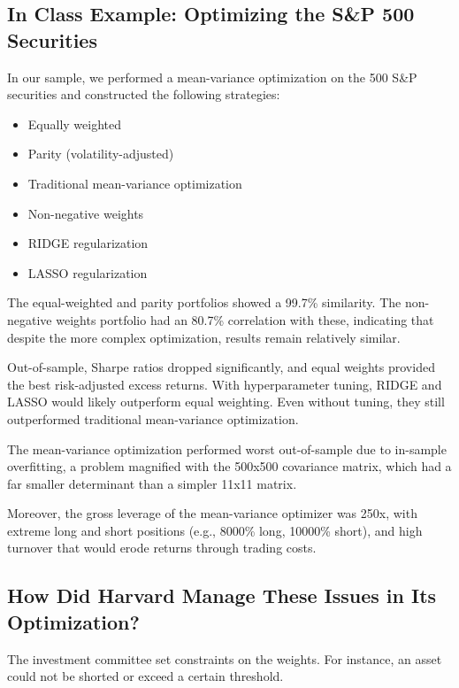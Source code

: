 \documentclass{article}
\begin{document}
\hypertarget{optimizing-the-sp-500-securities}{%
\subsection{In Class Example: Optimizing the S\&P 500
Securities}\label{optimizing-the-sp-500-securities}}

In our sample, we performed a mean-variance optimization on the 500 S\&P
securities and constructed the following strategies: 
\begin{itemize}
    \item Equally weighted
    \item Parity (volatility-adjusted)
    \item Traditional mean-variance optimization
    \item Non-negative weights
    \item RIDGE regularization
    \item LASSO regularization
\end{itemize}

The equal-weighted and parity portfolios showed a 99.7\% similarity. The
non-negative weights portfolio had an 80.7\% correlation with these,
indicating that despite the more complex optimization, results remain
relatively similar.

Out-of-sample, Sharpe ratios dropped significantly, and equal weights
provided the best risk-adjusted excess returns. With hyperparameter
tuning, RIDGE and LASSO would likely outperform equal weighting. Even
without tuning, they still outperformed traditional mean-variance
optimization.

The mean-variance optimization performed worst out-of-sample due to
in-sample overfitting, a problem magnified with the 500x500 covariance
matrix, which had a far smaller determinant than a simpler 11x11 matrix.

Moreover, the gross leverage of the mean-variance optimizer was 250x,
with extreme long and short positions (e.g., 8000\% long, 10000\%
short), and high turnover that would erode returns through trading
costs.

\hypertarget{how-did-harvard-manage-these-issues-in-its-optimization}{%
\subsection{How Did Harvard Manage These Issues in Its
Optimization?}\label{how-did-harvard-manage-these-issues-in-its-optimization}}

The investment committee set constraints on the weights. For instance,
an asset could not be shorted or exceed a certain threshold.
\end{document}
